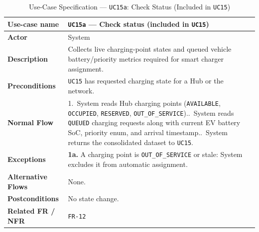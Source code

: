 \begin{table}[H]
  \centering
  \singlespacing\footnotesize
  \caption{Use-Case Specification --- \texttt{UC15a}: Check Status (Included in \texttt{UC15})}
  \label{tab:uc15a}
  \renewcommand{\arraystretch}{1.13}
  \begin{tabularx}{\textwidth}{|L{2.9cm}|Y|}
    \hline
    \textbf{Use-case name} & \textbf{\texttt{UC15a} --- Check status (included in \texttt{UC15})} \\
    \hline
    \textbf{Actor} & System \\
    \hline
    \textbf{Description} & Collects live charging-point states and queued vehicle battery/priority metrics required for smart charger assignment. \\
    \hline
    \textbf{Preconditions} & \texttt{UC15} has requested charging state for a Hub or the network. \\
    \hline
    \textbf{Normal Flow} & 1.\ System reads Hub charging points (\texttt{AVAILABLE}, \texttt{OCCUPIED}, \texttt{RESERVED}, \texttt{OUT\_\allowbreak OF\_\allowbreak SERVICE})..\ System reads \texttt{QUEUED} charging requests along with current EV battery SoC, priority enum, and arrival timestamp..\ System returns the consolidated dataset to \texttt{UC15}. \\
    \hline
    \textbf{Exceptions} & \textbf{1a.} A charging point is \texttt{OUT\_\allowbreak OF\_\allowbreak SERVICE} or stale: System excludes it from automatic assignment. \\
    \hline
    \textbf{Alternative Flows} & None. \\
    \hline
    \textbf{Postconditions} & No state change. \\
    \hline
    \textbf{Related FR / NFR} & \texttt{FR-12} \\
    \hline
  \end{tabularx}
\end{table}

